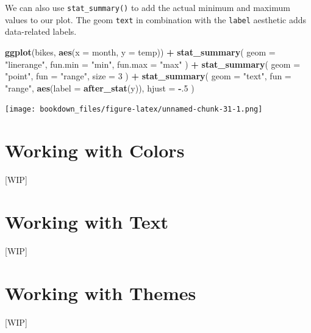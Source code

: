 \documentclass[
]{krantz}
\makeatletter
\newenvironment{Shaded}{\begin{snugshade}}{\end{snugshade}}
\newcommand{\AttributeTok}[1]{\textcolor[rgb]{0.27,0.27,0.27}{#1}}
\newcommand{\DecValTok}[1]{\textcolor[rgb]{0.06,0.06,0.06}{#1}}
\newcommand{\FunctionTok}[1]{\textcolor[rgb]{0.27,0.27,0.27}{\textbf{#1}}}
\newcommand{\NormalTok}[1]{#1}
\newcommand{\SpecialCharTok}[1]{\textcolor[rgb]{0.43,0.43,0.43}{\textbf{#1}}}
\newcommand{\StringTok}[1]{\textcolor[rgb]{0.5,0.5,0.5}{#1}}
\newenvironment{kframe}{%
\medskip{}
\setlength{\fboxsep}{.8em}
 \def\at@end@of@kframe{}%
 \ifinner\ifhmode%
  \def\at@end@of@kframe{\end{minipage}}%
  \begin{minipage}{\columnwidth}%
 \fi\fi%
 \def\FrameCommand##1{\hskip\@totalleftmargin \hskip-\fboxsep
 \colorbox{shadecolor}{##1}\hskip-\fboxsep
     \hskip-\linewidth \hskip-\@totalleftmargin \hskip\columnwidth}%
 \MakeFramed {\advance\hsize-\width
   \@totalleftmargin\z@ \linewidth\hsize
   \@setminipage}}%
 {\par\unskip\endMakeFramed%
 \at@end@of@kframe}
\renewenvironment{Shaded}{\begin{kframe}}{\end{kframe}}
\makeatother
\begin{document}
We can also use \texttt{stat\_summary()} to add the actual minimum and maximum values to our plot. The geom \texttt{text} in combination with the \texttt{label} aesthetic adds data-related labels.

\begin{Shaded}
\begin{Highlighting}[]
\FunctionTok{ggplot}\NormalTok{(bikes, }\FunctionTok{aes}\NormalTok{(}\AttributeTok{x =}\NormalTok{ month, }\AttributeTok{y =}\NormalTok{ temp)) }\SpecialCharTok{+} 
  \FunctionTok{stat\_summary}\NormalTok{(}
    \AttributeTok{geom =} \StringTok{"linerange"}\NormalTok{,}
    \AttributeTok{fun.min =} \StringTok{"min"}\NormalTok{,}
    \AttributeTok{fun.max =} \StringTok{"max"}
\NormalTok{  ) }\SpecialCharTok{+}
  \FunctionTok{stat\_summary}\NormalTok{(}
    \AttributeTok{geom =} \StringTok{"point"}\NormalTok{,}
    \AttributeTok{fun =} \StringTok{"range"}\NormalTok{,}
    \AttributeTok{size =} \DecValTok{3}
\NormalTok{  ) }\SpecialCharTok{+}
  \FunctionTok{stat\_summary}\NormalTok{(}
    \AttributeTok{geom =} \StringTok{"text"}\NormalTok{,}
    \AttributeTok{fun =} \StringTok{"range"}\NormalTok{,}
    \FunctionTok{aes}\NormalTok{(}\AttributeTok{label =} \FunctionTok{after\_stat}\NormalTok{(y)),}
    \AttributeTok{hjust =} \SpecialCharTok{{-}}\NormalTok{.}\DecValTok{5}
\NormalTok{  )}
\end{Highlighting}
\end{Shaded}

\texttt{[image: bookdown\_files/figure-latex/unnamed-chunk-31-1.png]}

\hypertarget{working-with-colors}{%
\chapter{Working with Colors}\label{working-with-colors}}

{[}WIP{]}

\hypertarget{working-with-text}{%
\chapter{Working with Text}\label{working-with-text}}

{[}WIP{]}

\hypertarget{working-with-themes}{%
\chapter{Working with Themes}\label{working-with-themes}}

{[}WIP{]}
\end{document}
